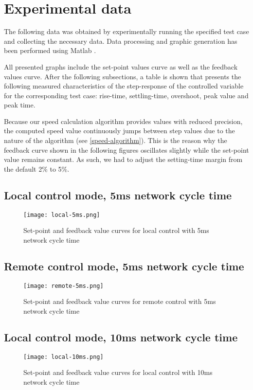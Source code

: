 \section{Experimental data}
The following data was obtained by experimentally running the specified test case and collecting the necessary data.
Data processing and graphic generation has been performed using Matlab \cite{sw:matlab}.

All presented graphs include the set-point values curve as well as the feedback values curve.
After the following subsections, a table is shown that presents the following measured characteristics of the step-response of the controlled variable for the corresponding test case: rise-time, settling-time, overshoot, peak value and peak time.

Because our speed calculation algorithm provides values with reduced precision, the computed speed value continuously jumps between step values due to the nature of the algorithm (see \autoref{speed-algorithm}).
This is the reason why the feedback curve shown in the following figures oscillates slightly while the set-point value remains constant.
As such, we had to adjust the setting-time margin from the default 2\% to 5\%.

\clearpage

\subsection*{Local control mode, 5ms network cycle time}
\begin{figure}[H]
	\centering
	\texttt{[image: local-5ms.png]}
	\caption{Set-point and feedback value curves for local control with 5ms network cycle time}
	\label{fig:local-5ms}
\end{figure}

\subsection*{Remote control mode, 5ms network cycle time}
\begin{figure}[H]
	\centering
	\texttt{[image: remote-5ms.png]}
	\caption{Set-point and feedback value curves for remote control with 5ms network cycle time}
	\label{fig:remote-5ms}
\end{figure}

\subsection*{Local control mode, 10ms network cycle time}
\begin{figure}[H]
	\centering
	\texttt{[image: local-10ms.png]}
	\caption{Set-point and feedback value curves for local control with 10ms network cycle time}
	\label{fig:local-10ms}
\end{figure}

